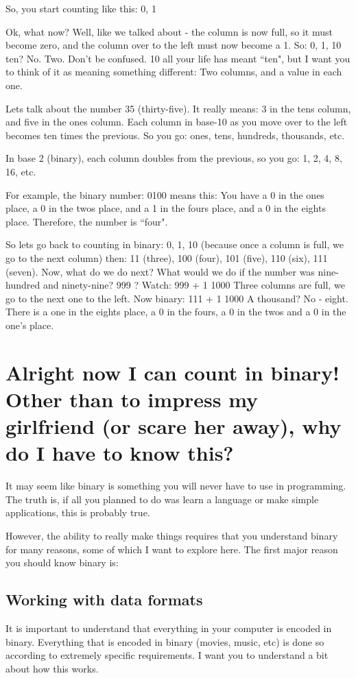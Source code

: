\documentclass[a4paper,12pt]{article}
\let\stdsection\section
\renewcommand\section{\newpage\stdsection}
\begin{document}
So, you start counting like this: 0, 1

Ok, what now? Well, like we talked about - the column is now full, so it must become zero, and the column over to the left must now become a 1. So:
0, 1, 10
ten? No. Two. Don't be confused. 10 all your life has meant ``ten", but I want you to think of it as meaning something different: Two columns, and a value in each one.

Lets talk about the number 35 (thirty-five). It really means: 3 in the tens column, and five in the ones column. Each column in base-10 as you move over to the left becomes ten times the previous. So you go: ones, tens, hundreds, thousands, etc.

In base 2 (binary), each column doubles from the previous, so you go: 1, 2, 4, 8, 16, etc.

For example, the binary number: 0100 means this: You have a 0 in the ones place, a 0 in the twos place, and a 1 in the fours place, and a 0 in the eights place. Therefore, the number is ``four".

So lets go back to counting in binary:
0, 1, 10 (because once a column is full, we go to the next column) then: 11 (three), 100 (four), 101 (five), 110 (six), 111 (seven).
Now, what do we do next? What would we do if the number was nine-hundred and ninety-nine? 999 ? Watch:
999 + 1
1000
Three columns are full, we go to the next one to the left. Now binary:
111 + 1
1000
A thousand? No - eight. There is a one in the eights place, a 0 in the fours, a 0 in the twos and a 0 in the one's place.
\section{Alright now I can count in binary! Other than to impress my girlfriend (or scare her away), why do I have to know this?}
It may seem like binary is something you will never have to use in programming. The truth is, if all you planned to do was learn a language or make simple applications, this is probably true.

However, the ability to really make things requires that you understand binary for many reasons, some of which I want to explore here. The first major reason you should know binary is:
\subsection{Working with data formats}
It is important to understand that everything in your computer is encoded in binary. Everything that is encoded in binary (movies, music, etc) is done so according to extremely specific requirements. I want you to understand a bit about how this works.
\end{document}
